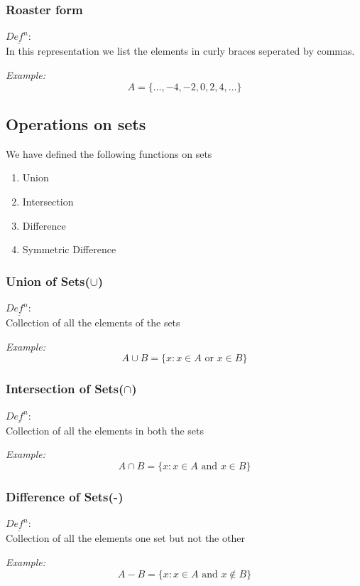 \documentclass[11pt,letterpaper]{article}
\newenvironment{example}                             
        {\noindent\textit{Example:}\\}
	{}
\newenvironment{definition}
	{\begin{mdframed}$\underline{\textit{Def}^\textit{n}:} $\\}
	{\end{mdframed}}
\begin{document}
\subsubsection{Roaster form}
\begin{definition}
  In this representation we list the elements in curly braces seperated by commas. 
\end{definition}
\begin{example}
  \[
    A = \{\dots,-4,-2,0,2,4,\dots\}
  \]
\end{example}

\subsection{Operations on sets}
We have defined the following functions on sets 
\begin{enumerate}
  \item Union
  \item Intersection
  \item Difference
  \item Symmetric Difference
\end{enumerate}

\subsubsection{Union of Sets($\cup$)}
\begin{definition}
  Collection of all the elements of the sets
\end{definition}
\begin{example}
  \[
    A\cup B= \{x: x\in A \text{ or } x\in B\}
  \]
\end{example}

\subsubsection{Intersection of Sets($\cap$)}
\begin{definition}
  Collection of all the elements in both the sets
\end{definition}
\begin{example}
  \[
    A\cap B= \{x: x\in A \text{ and } x\in B\}
  \]
\end{example}

\subsubsection{Difference of Sets(-)}
\begin{definition}
  Collection of all the elements one set but not the other
\end{definition}
\begin{example}
  \[
    A-B= \{x: x\in A \text{ and } x\not\in B\}
  \]
\end{example}
\end{document}
